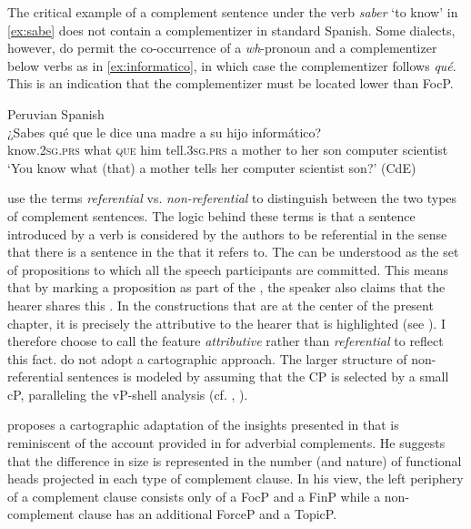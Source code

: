  
The critical example of a complement sentence under the  verb \emph{saber} `to know' in \eqref{ex:sabe} does not contain a complementizer in standard Spanish.  Some dialects, however, do permit the co-occurrence of a \textit{wh}-pronoun and a complementizer  below  verbs as in \eqref{ex:informatico}, in which case  the complementizer follows \textit{qué}. This is an indication that the complementizer must be located lower than FocP.

\ea\label{ex:informatico} Peruvian Spanish\\ 
\gll ¿Sabes qué que le dice una madre a su hijo informático?  \\
know.\textsc{2sg.prs} what \textsc{que} him tell.\textsc{3sg.prs} a mother to her son {computer scientist} \\
\glt `You know what (that) a mother tells her computer scientist son?' (CdE)
\z

 use the terms \emph{referential} vs. \emph{non-referential}  to distinguish between the two types of complement sentences. The logic behind these terms is that a sentence introduced by a  verb is considered by the authors to be referential in the sense that there is  a sentence in the  that it refers to. The  can be understood as the set of propositions to which all the speech participants are committed. This means that by marking a proposition as part of the , the speaker also claims that the hearer shares this . In the  constructions that are at the center of the present chapter,  it is precisely the attributive   to the hearer that is highlighted (see ). I therefore choose to call the feature \emph{attributive} rather than \emph{referential} to reflect this fact.     do not adopt a cartographic approach. The larger structure of non-referential sentences is modeled by assuming  that the CP is selected by a small cP, paralleling the vP-shell analysis (cf. \citealt{Chomsky1955}, \citealt{Larson1988, Larson1990}).  

\begin{sloppypar}
\citet{VillaGarcia2015} proposes a cartographic adaptation of the insights presented in \citet{Cuba2013} that is reminiscent of the account provided in \citet{Haegeman2004, Haegeman2006} for adverbial complements. He suggests that the difference in size is represented in the number (and nature) of functional heads projected in each type of complement clause. In his view, the left periphery of a   complement clause  consists only of a FocP and a FinP while a  non- complement clause has an additional ForceP and a TopicP.
\end{sloppypar}


